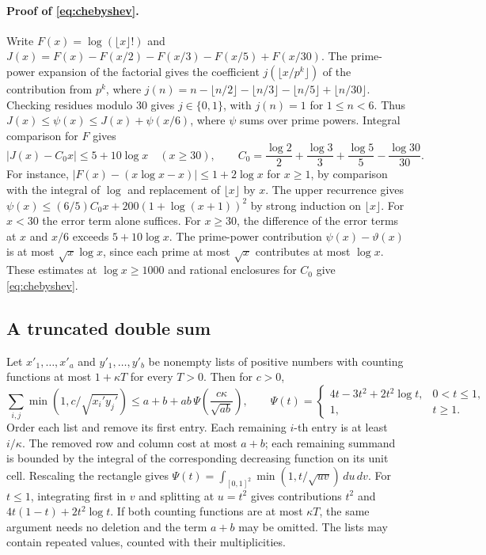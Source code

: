 \documentclass[11pt,a4paper]{article}
\begin{document}
\paragraph{Proof of \eqref{eq:chebyshev}.}
Write \(F(x)=\log(\lfloor x\rfloor!)\) and
\(J(x)=F(x)-F(x/2)-F(x/3)-F(x/5)+F(x/30)\).
The prime-power expansion of the factorial gives the coefficient
\(j(\lfloor x/p^k\rfloor)\) of the contribution from \(p^k\), where
\(j(n)=n-\lfloor n/2\rfloor-\lfloor n/3\rfloor-\lfloor n/5\rfloor+
\lfloor n/30\rfloor\). Checking residues modulo \(30\) gives
\(j\in\{0,1\}\), with \(j(n)=1\) for \(1\le n<6\). Thus
\(J(x)\le\psi(x)\le J(x)+\psi(x/6)\), where \(\psi\) sums over prime
powers. Integral comparison for \(F\) gives
\[
 |J(x)-C_0x|\le5+10\log x\quad(x\ge30),\qquad
 C_0=\frac{\log2}{2}+\frac{\log3}{3}+\frac{\log5}{5}-\frac{\log30}{30}.
\]
For instance, \(|F(x)-(x\log x-x)|\le1+2\log x\) for \(x\ge1\),
by comparison with the integral of \(\log\) and replacement of
\(\lfloor x\rfloor\) by \(x\).
The upper recurrence gives
\(\psi(x)\le(6/5)C_0x+200(1+\log(x+1))^2\)
by strong induction on \(\lfloor x\rfloor\). For \(x<30\) the
error term alone suffices. For \(x\ge30\), the difference of the
error terms at \(x\) and \(x/6\) exceeds \(5+10\log x\).
The prime-power contribution \(\psi(x)-\vartheta(x)\) is at most
\(\sqrt{x}\log x\), since each prime at most \(\sqrt{x}\) contributes
at most \(\log x\). These estimates at \(\log x\ge1000\) and rational
enclosures for \(C_0\) give \eqref{eq:chebyshev}.

\subsection{A truncated double sum}

Let \(x'_1,\ldots,x'_a\) and \(y'_1,\ldots,y'_b\) be nonempty
lists of positive numbers with counting functions at most \(1+\kappa T\) for
every \(T>0\). Then for \(c>0\),
\[
 \sum_{i,j}\min(1,c/\sqrt{x_i'y_j'})
 \le a+b+ab\,\Psi\left(\frac{c\kappa}{\sqrt{ab}}\right),
 \qquad
 \Psi(t)=
 \begin{cases}
 4t-3t^2+2t^2\log t,&0<t\le1,\\
 1,&t\ge1.
 \end{cases}
\]
Order each list and remove its first entry. Each remaining \(i\)-th
entry is at least \(i/\kappa\). The removed row and column cost at
most \(a+b\); each remaining summand is bounded by the integral of
the corresponding decreasing function on its unit cell.
Rescaling the rectangle gives
\(\Psi(t)=\int_{[0,1]^2}\min(1,t/\sqrt{uv})\,du\,dv\).
For \(t\le1\), integrating first in \(v\) and splitting at \(u=t^2\)
gives contributions \(t^2\) and \(4t(1-t)+2t^2\log t\).
If both counting functions are at most \(\kappa T\), the same
argument needs no deletion and the term \(a+b\) may be omitted.
The lists may contain repeated values, counted with their multiplicities.
\end{document}
